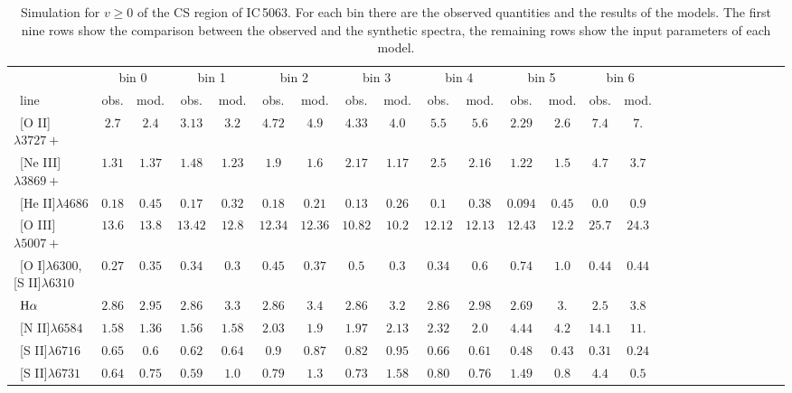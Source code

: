 \documentclass[../thesis.tex]{subfiles}
\begin{document}
\begin{landscape}
\begin{table}

\centering
\caption{Simulation for $v \ge 0$ of the CS region of IC\,5063. For each bin there are the observed quantities and the results of the models. The first nine rows show the comparison between the observed and the synthetic spectra, the remaining rows show the input parameters of each model.}
\label{tab:sim_cs+}
\footnotesize{
\begin{tabular}{lcccccccccccccccccccccccc} 
\hline 
\ &\multicolumn{2}{c}{bin 0} &\multicolumn{2}{c}{bin 1}&\multicolumn{2}{c}{bin 2}&\multicolumn{2}{c}{bin 3}&\multicolumn{2}{c}{bin 4}&\multicolumn{2}{c}{bin 5}&\multicolumn{2}{c}{bin 6}\\
\   line              &obs.  &mod.  & obs.  & mod. &obs.&mod.   &obs.  &mod.  &obs.  &mod.  &obs.  &mod. &obs.&mod. \\ 
\hline
\ [O II]$\lambda3727+$ &$2.7  $&$2.4  $&$3.13  $&$ 3.2 $&$4.72$&$4.9  $&$4.33 $&$4.0  $&$5.5 $ &$5.6 $ &$2.29$ &$2.6 $&$7.4$&$7.$ \\
\ [Ne III]$\lambda3869+$       &$1.31 $&$1.37 $&$1.48  $&$ 1.23$&$1.9$&$1.6 $ &$2.17 $&$1.17 $&$2.5 $ &$2.16 $&$1.22 $&$1.5 $&$4.7$&$3.7$ \\
\ [He II]$\lambda4686$          &$0.18 $&$0.45 $&$0.17 $ &$ 0.32$&$0.18$&$0.21$ &$0.13$ &$0.26 $&$0.1  $&$0.38 $&$0.094$&$0.45$&$0.0$&$0.9$\\
\ [O III]$\lambda5007+$        &$13.6 $&$13.8$ &$13.42 $&$ 12.8$&$12.34$&$12.36$&$10.82$&$10.2$ &$12.12$&$12.13$&$12.43$&$12.2$&$25.7$&$24.3 $\\
\ [O I]$\lambda6300$,[S II]$\lambda6310$&$0.27 $&$0.35 $&$0.34 $ &$0.3  $&$0.45$&$0.37$ &$0.5 $ &$0.3 $ &$0.34 $&$0.6 $ &$0.74 $&$1.0$&$0.44$&$0.44$ \\
\ $\rm H\alpha$                &$2.86 $&$2.95 $&$2.86 $ &$ 3.3 $&$2.86$&$3.4 $ &$2.86 $&$3.2  $&$2.86 $&$2.98 $&$2.69 $&$3. $&$2.5$&$3.8$ \\
\ [N II]$\lambda6584$          &$1.58$ &$1.36$ &$1.56$  &$ 1.58$&$2.03$&$1.9 $ &$1.97$ &$2.13 $&$2.32$ &$2.0 $ &$4.44 $&$4.2 $&$14.1$&$11.$\\
\ [S II]$\lambda6716$          &$0.65$ &$0.6$  &$0.62$  &$ 0.64$&$0.9 $&$0.87 $&$0.82$ &$0.95 $&$0.66$ &$0.61$ &$0.48$ &$0.43$&$0.31$&$0.24$\\
\ [S II]$\lambda6731   $       &$0.64$ &$0.75$ &$0.59$  &$ 1.0 $&$0.79$&$1.3  $&$0.73 $&$1.58$ &$0.80$ &$0.76 $&$1.49$ &$0.8$&$4.4$&$0.5$ \\

\end{tabular}}
\end{table}
\end{landscape}
\end{document}
